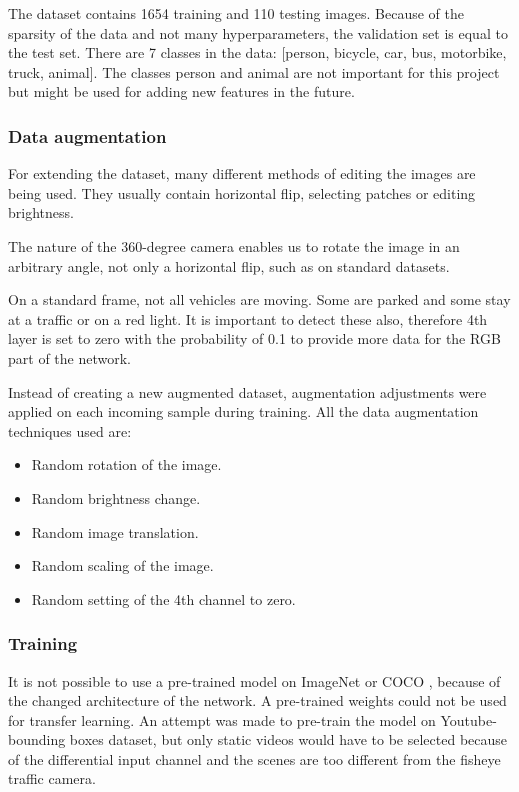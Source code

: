\documentclass[a4paper,11pt,titlepage,twoside]{article}
\numberwithin{figure}{section}
\begin{document}
The dataset contains 1654 training and 110 testing images. Because of the sparsity of the data and not many hyperparameters, the validation set is equal to the test set. There are 7 classes in the data: [person, bicycle, car, bus, motorbike, truck, animal]. The classes person and animal are not important for this project but might be used for adding new features in the future.
\subsubsection{Data augmentation}
For extending the dataset, many different methods of editing the images are being used. They usually contain horizontal flip, selecting patches or editing brightness. 

The nature of the 360-degree camera enables us to rotate the image in an arbitrary angle, not only a horizontal flip, such as on standard datasets. 

On a standard frame, not all vehicles are moving. Some are parked and some stay at a traffic or on a red light. It is important to detect these also, therefore 4th layer is set to zero with the probability of 0.1 to provide more data for the RGB part of the network.

Instead of creating a new augmented dataset, augmentation adjustments were applied on each incoming sample during training. All the data augmentation techniques used are:

\begin{itemize}[itemsep=5pt,parsep=2pt]
\item Random rotation of the image.
\item Random brightness change.
\item Random image translation.
\item Random scaling of the image.
\item Random setting of the 4th channel to zero.
\end{itemize}

\subsubsection{Training}
It is not possible to use a pre-trained model on ImageNet\cite{deng2009imagenet} or COCO \cite{lin2014microsoft}, because of the changed architecture of the network. A pre-trained weights could not be used for transfer learning. An attempt was made to pre-train the model on Youtube-bounding boxes dataset\cite{real2017youtube}, but only static videos would have to be selected because of the differential input channel and the scenes are too different from the fisheye traffic camera.
\end{document}

